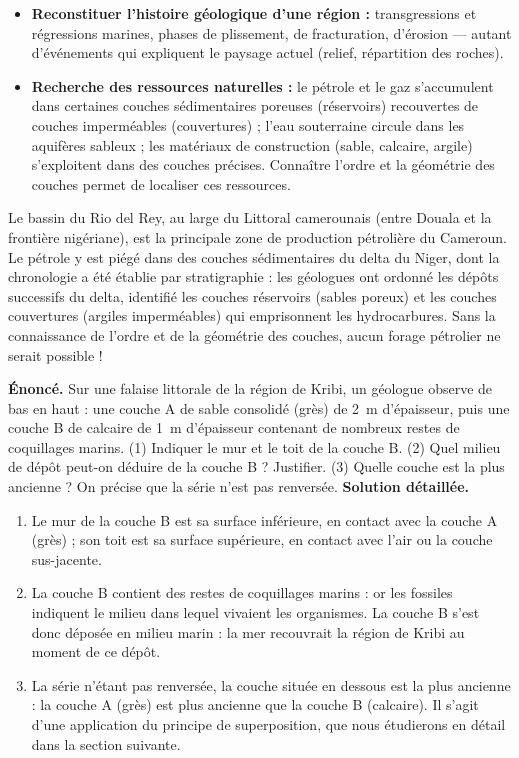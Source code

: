 \documentclass[11pt]{article}
\newcommand{\cle}[1]{{\popxbold\color{popdark}#1}}
\begin{document}
\begin{itemize}
\item \textbf{Reconstituer l'histoire géologique d'une région :} transgressions et régressions marines, phases de plissement, de fracturation, d'érosion — autant d'événements qui expliquent le paysage actuel (relief, répartition des roches).
\item \textbf{Recherche des ressources naturelles :} le \cle{pétrole} et le gaz s'accumulent dans certaines couches sédimentaires poreuses (réservoirs) recouvertes de couches imperméables (couvertures) ; l'\cle{eau souterraine} circule dans les aquifères sableux ; les matériaux de construction (sable, calcaire, argile) s'exploitent dans des couches précises. Connaître l'ordre et la géométrie des couches permet de localiser ces ressources.
\end{itemize}

\begin{savaistu}
Le bassin du Rio del Rey, au large du Littoral camerounais (entre Douala et la frontière nigériane), est la principale zone de production pétrolière du Cameroun. Le pétrole y est piégé dans des couches sédimentaires du delta du Niger, dont la chronologie a été établie par stratigraphie : les géologues ont ordonné les dépôts successifs du delta, identifié les couches réservoirs (sables poreux) et les couches couvertures (argiles imperméables) qui emprisonnent les hydrocarbures. Sans la connaissance de l'ordre et de la géométrie des couches, aucun forage pétrolier ne serait possible !
\end{savaistu}

\begin{exoresolu}
\textbf{Énoncé.} Sur une falaise littorale de la région de Kribi, un géologue observe de bas en haut : une couche A de sable consolidé (grès) de 2~m d'épaisseur, puis une couche B de calcaire de 1~m d'épaisseur contenant de nombreux restes de coquillages marins. (1) Indiquer le mur et le toit de la couche B. (2) Quel milieu de dépôt peut-on déduire de la couche B ? Justifier. (3) Quelle couche est la plus ancienne ? On précise que la série n'est pas renversée.
\tcblower
\textbf{Solution détaillée.}
\begin{enumerate}
\item Le \cle{mur} de la couche B est sa surface inférieure, en contact avec la couche A (grès) ; son \cle{toit} est sa surface supérieure, en contact avec l'air ou la couche sus-jacente.
\item La couche B contient des restes de \cle{coquillages marins} : or les fossiles indiquent le milieu dans lequel vivaient les organismes. La couche B s'est donc déposée en \cle{milieu marin} : la mer recouvrait la région de Kribi au moment de ce dépôt.
\item La série n'étant pas renversée, la couche située en dessous est la plus ancienne : la couche A (grès) est plus ancienne que la couche B (calcaire). Il s'agit d'une application du principe de superposition, que nous étudierons en détail dans la section suivante.
\end{enumerate}
\end{exoresolu}
\end{document}
